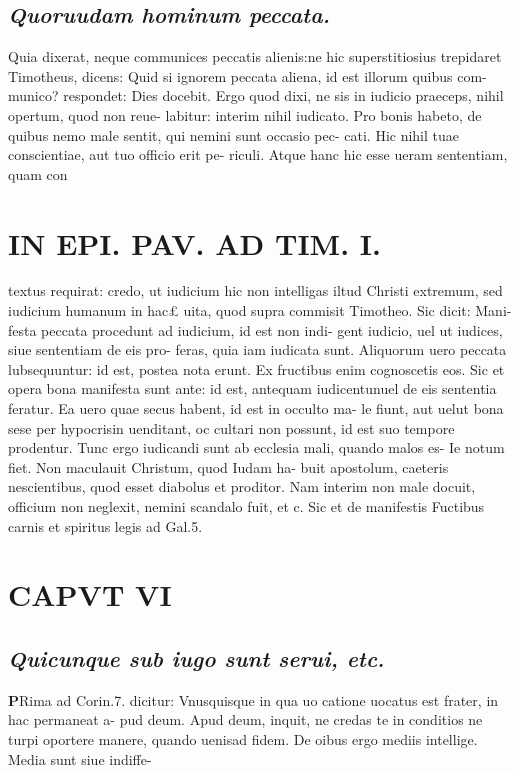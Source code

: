 \documentclass{article}
\begin{document}
\begin{pages}
\subsection*{\textit{Quoruudam hominum peccata. }}\pstart Quia dixerat, neque communices peccatis alienis:ne hic superstitiosius trepidaret Timotheus, dicens: Quid si ignorem peccata aliena, id est illorum quibus com- munico? respondet: Dies docebit. Ergo quod dixi, ne sis in iudicio praeceps, nihil opertum, quod non reue- labitur: interim nihil iudicato. Pro bonis habeto, de quibus nemo male sentit, qui nemini sunt occasio pec- cati. Hic nihil tuae conscientiae, aut tuo officio erit pe- riculi. Atque hanc hic esse ueram sententiam, quam con  \pend
\section*{IN EPI. PAV. AD TIM. I. }
\marginpar{[ p.97 ]}\pstart textus requirat: credo, ut iudicium hic non intelligas iltud Christi extremum, sed iudicium humanum in hac£ uita, quod supra commisit Timotheo. Sic dicit: Mani- festa peccata procedunt ad iudicium, id est non indi- gent iudicio, uel ut iudices, siue sententiam de eis pro- feras, quia iam iudicata sunt. Aliquorum uero peccata lubsequuntur: id est, postea nota erunt. Ex fructibus enim cognoscetis eos. Sic et opera bona manifesta sunt ante: id est, antequam iudicentunuel de eis sententia feratur. Ea uero quae secus habent, id est in occulto ma- le fiunt, aut uelut bona sese per hypocrisin uenditant, oc cultari non possunt, id est suo tempore prodentur. Tunc ergo iudicandi sunt ab ecclesia mali, quando malos es- Ie notum fiet. Non maculauit Christum, quod Iudam ha- buit apostolum, caeteris nescientibus, quod esset diabolus et proditor. Nam interim non male docuit, officium non neglexit, nemini scandalo fuit, et c. Sic et de manifestis Fuctibus carnis et spiritus legis ad Gal.5.  \pend
\endnumbering\beginnumbering\section{CAPVT VI}
{}
\subsection*{\textit{Quicunque sub iugo sunt serui, etc. }}\pstart \huge\textbf{P}\normalsize Rima ad Corin.7. dicitur: Vnusquisque in qua uo catione uocatus est frater, in hac permaneat a- pud deum. Apud deum, inquit, ne credas te in conditios ne turpi oportere manere, quando uenisad fidem. De oibus ergo mediis intellige. Media sunt siue indiffe-  \pend

\end{pages}
\end{document}
